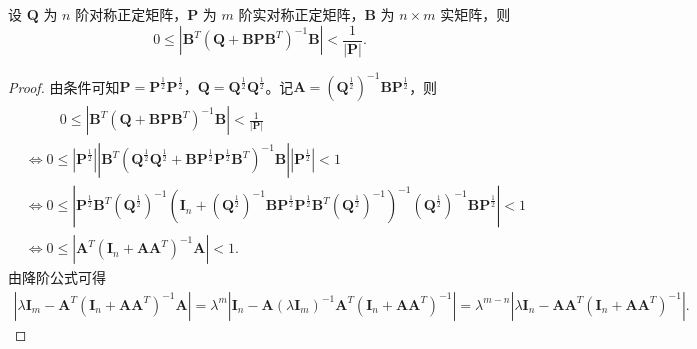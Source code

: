 \documentclass[../../main.tex]{subfiles}%
\begin{document}
\begin{example}\label{example:例题9.3112223444}
设 $\boldsymbol{Q}$ 为 $n$ 阶对称正定矩阵，$\boldsymbol{P}$ 为 $m$ 阶实对称正定矩阵，$\boldsymbol{B}$ 为 $n \times m$ 实矩阵，则
$$0 \leqslant |\boldsymbol{B}^{T}(\boldsymbol{Q} + \boldsymbol{B}\boldsymbol{P}\boldsymbol{B}^{T})^{-1}\boldsymbol{B}| < \frac{1}{|\boldsymbol{P}|}.$$
\end{example}
\begin{proof}

由条件可知$\boldsymbol{P} = \boldsymbol{P}^{\frac{1}{2}}\boldsymbol{P}^{\frac{1}{2}}$，$\boldsymbol{Q} = \boldsymbol{Q}^{\frac{1}{2}}\boldsymbol{Q}^{\frac{1}{2}}$。记$\boldsymbol{A} = \left( \boldsymbol{Q}^{\frac{1}{2}} \right)^{-1}\boldsymbol{B}\boldsymbol{P}^{\frac{1}{2}}$，则
\begin{align*}
&\qquad\,\,\, 0 \leqslant |\boldsymbol{B}^{T}(\boldsymbol{Q} + \boldsymbol{B}\boldsymbol{P}\boldsymbol{B}^{T})^{-1}\boldsymbol{B}| < \frac{1}{|\boldsymbol{P}|}
\\
&\Longleftrightarrow 0 \leqslant \left| \boldsymbol{P}^{\frac{1}{2}} \right| \left| \boldsymbol{B}^{T} \left( \boldsymbol{Q}^{\frac{1}{2}}\boldsymbol{Q}^{\frac{1}{2}} + \boldsymbol{B}\boldsymbol{P}^{\frac{1}{2}}\boldsymbol{P}^{\frac{1}{2}}\boldsymbol{B}^{T} \right)^{-1}\boldsymbol{B} \right| \left| \boldsymbol{P}^{\frac{1}{2}} \right| < 1 \\
&\Longleftrightarrow 0 \leqslant \left| \boldsymbol{P}^{\frac{1}{2}}\boldsymbol{B}^{T} \left( \boldsymbol{Q}^{\frac{1}{2}} \right)^{-1} \left( \boldsymbol{I}_n + \left( \boldsymbol{Q}^{\frac{1}{2}} \right)^{-1}\boldsymbol{B}\boldsymbol{P}^{\frac{1}{2}}\boldsymbol{P}^{\frac{1}{2}}\boldsymbol{B}^{T} \left( \boldsymbol{Q}^{\frac{1}{2}} \right)^{-1} \right)^{-1} \left( \boldsymbol{Q}^{\frac{1}{2}} \right)^{-1}\boldsymbol{B}\boldsymbol{P}^{\frac{1}{2}} \right| < 1 \\
&\Longleftrightarrow 0 \leqslant \left| \boldsymbol{A}^{T}(\boldsymbol{I}_n + \boldsymbol{A}\boldsymbol{A}^{T})^{-1}\boldsymbol{A} \right| < 1.
\end{align*}
由降阶公式可得
\begin{align*}
\left| \lambda \boldsymbol{I}_m - \boldsymbol{A}^{T} \left( \boldsymbol{I}_n + \boldsymbol{A}\boldsymbol{A}^{T} \right)^{-1}\boldsymbol{A} \right| = \lambda^m \left| \boldsymbol{I}_n - \boldsymbol{A} \left( \lambda \boldsymbol{I}_m \right)^{-1}\boldsymbol{A}^{T} \left( \boldsymbol{I}_n + \boldsymbol{A}\boldsymbol{A}^{T} \right)^{-1} \right| = \lambda^{m-n} \left| \lambda \boldsymbol{I}_n - \boldsymbol{A}\boldsymbol{A}^{T} \left( \boldsymbol{I}_n + \boldsymbol{A}\boldsymbol{A}^{T} \right)^{-1} \right|.

\end{align*}
\end{proof}
\end{document}
